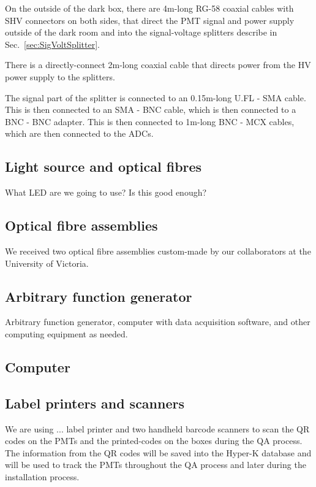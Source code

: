 \documentclass[12pt,a4paper]{article}
\begin{document}
On the outside of the dark box, there are 4m-long RG-58 coaxial cables with SHV connectors on both sides, that direct the PMT signal and power supply outside of the dark room and into the signal-voltage splitters describe in Sec.~\ref{sec:SigVoltSplitter}.

There is a directly-connect 2m-long coaxial cable that directs power from the HV power supply to the splitters.

The signal part of the splitter is connected to an 0.15m-long U.FL - SMA cable. This is then connected to an SMA - BNC cable, which is then connected to a BNC - BNC adapter. This is then connected to 1m-long BNC - MCX cables, which are then connected to the ADCs.

\subsection{Light source and optical fibres}

What LED are we going to use? Is this good enough?

\subsection{Optical fibre assemblies}
We received two optical fibre assemblies custom-made by our collaborators at the University of Victoria.

\subsection{Arbitrary function generator}
Arbitrary function generator, computer with data acquisition software, and other computing equipment as needed.

\subsection{Computer}

\subsection{Label printers and scanners}

We are using ... label printer and two handheld barcode scanners to scan the QR codes on the PMTs and the printed-codes on the boxes during the QA process. The information from the QR codes will be saved into the Hyper-K database and will be used to track the PMTs throughout the QA process and later during the installation process.
\end{document}
